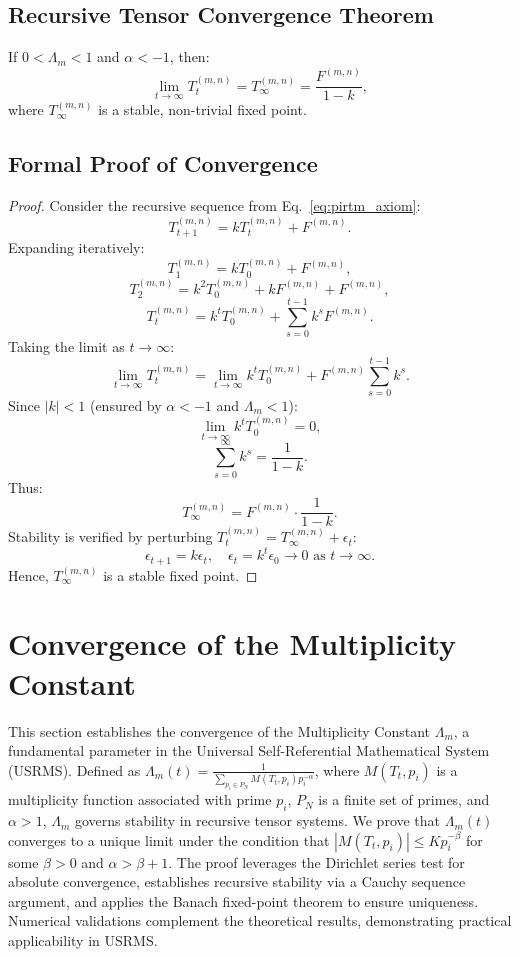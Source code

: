 \documentclass{article}
\theoremstyle{plain}
\begin{document}
\subsection{Recursive Tensor Convergence Theorem}
If \( 0 < \Lambda_m < 1 \) and \( \alpha < -1 \), then:
\begin{equation}
\lim_{t \to \infty} T_t^{(m,n)} = T_\infty^{(m,n)} = \frac{F^{(m,n)}}{1 - k},
\label{eq:pirtm_theorem}
\end{equation}
where \( T_\infty^{(m,n)} \) is a stable, non-trivial fixed point.

\subsection{Formal Proof of Convergence}
\begin{proof}
Consider the recursive sequence from Eq.~\eqref{eq:pirtm_axiom}:
\[
T_{t+1}^{(m,n)} = k T_t^{(m,n)} + F^{(m,n)}.
\]
Expanding iteratively:
\[
T_1^{(m,n)} = k T_0^{(m,n)} + F^{(m,n)},
\]
\[
T_2^{(m,n)} = k^2 T_0^{(m,n)} + k F^{(m,n)} + F^{(m,n)},
\]
\[
T_t^{(m,n)} = k^t T_0^{(m,n)} + \sum_{s=0}^{t-1} k^s F^{(m,n)}.
\]
Taking the limit as \( t \to \infty \):
\[
\lim_{t \to \infty} T_t^{(m,n)} = \lim_{t \to \infty} k^t T_0^{(m,n)} + F^{(m,n)} \sum_{s=0}^{t-1} k^s.
\]
Since \( |k| < 1 \) (ensured by \( \alpha < -1 \) and \( \Lambda_m < 1 \)):
\[
\lim_{t \to \infty} k^t T_0^{(m,n)} = 0,
\]
\[
\sum_{s=0}^\infty k^s = \frac{1}{1 - k}.
\]
Thus:
\[
T_\infty^{(m,n)} = F^{(m,n)} \cdot \frac{1}{1 - k}.
\]
Stability is verified by perturbing \( T_t^{(m,n)} = T_\infty^{(m,n)} + \epsilon_t \):
\[
\epsilon_{t+1} = k \epsilon_t, \quad \epsilon_t = k^t \epsilon_0 \to 0 \text{ as } t \to \infty.
\]
Hence, \( T_\infty^{(m,n)} \) is a stable fixed point.
\end{proof}



\section{Convergence of the Multiplicity Constant}
This section establishes the convergence of the Multiplicity Constant \( \Lambda_m \), a fundamental parameter in the Universal Self-Referential Mathematical System (USRMS). Defined as \( \Lambda_m(t) = \frac{1}{\sum_{p_i \in P_N} M(T_t, p_i) p_i^{-\alpha}} \), where \( M(T_t, p_i) \) is a multiplicity function associated with prime \( p_i \), \( P_N \) is a finite set of primes, and \( \alpha > 1 \), \( \Lambda_m \) governs stability in recursive tensor systems. We prove that \( \Lambda_m(t) \) converges to a unique limit under the condition that \( |M(T_t, p_i)| \leq K p_i^{-\beta} \) for some \( \beta > 0 \) and \( \alpha > \beta + 1 \). The proof leverages the Dirichlet series test for absolute convergence, establishes recursive stability via a Cauchy sequence argument, and applies the Banach fixed-point theorem to ensure uniqueness. Numerical validations complement the theoretical results, demonstrating practical applicability in USRMS.
\end{document}
